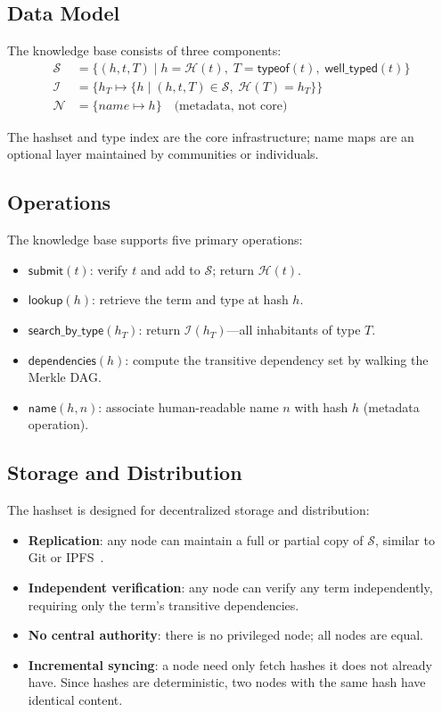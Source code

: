 \documentclass[11pt]{article}
\theoremstyle{definition}
\theoremstyle{plain}
\theoremstyle{remark}
\newcommand{\hash}{\mathcal{H}}
\newcommand{\hashset}{\mathcal{S}}
\newcommand{\typeindex}{\mathcal{I}}
\newcommand{\namemap}{\mathcal{N}}
\begin{document}
\subsection{Data Model}
\label{sec:data-model}

The knowledge base consists of three components:
\begin{align*}
  \hashset &= \{ (h, t, T) \mid h = \hash(t),\; T = \textsf{typeof}(t),\; \textsf{well\_typed}(t) \} \\
  \typeindex &= \{ h_T \mapsto \{ h \mid (h, t, T) \in \hashset,\; \hash(T) = h_T \} \} \\
  \namemap &= \{ \textit{name} \mapsto h \} \quad \text{(metadata, not core)}
\end{align*}

The hashset and type index are the core infrastructure; name maps are an optional layer
maintained by communities or individuals.

\subsection{Operations}
\label{sec:operations}

The knowledge base supports five primary operations:
\begin{itemize}[nosep]
  \item $\textsf{submit}(t)$: verify $t$ and add to $\hashset$; return $\hash(t)$.
  \item $\textsf{lookup}(h)$: retrieve the term and type at hash $h$.
  \item $\textsf{search\_by\_type}(h_T)$: return $\typeindex(h_T)$---all inhabitants of type $T$.
  \item $\textsf{dependencies}(h)$: compute the transitive dependency set by walking the Merkle DAG.
  \item $\textsf{name}(h, n)$: associate human-readable name $n$ with hash $h$ (metadata operation).
\end{itemize}

\subsection{Storage and Distribution}
\label{sec:distribution}

The hashset is designed for decentralized storage and distribution:
\begin{itemize}[nosep]
  \item \textbf{Replication}: any node can maintain a full or partial copy of $\hashset$,
    similar to Git or IPFS~\cite{ipfs}.
  \item \textbf{Independent verification}: any node can verify any term independently,
    requiring only the term's transitive dependencies.
  \item \textbf{No central authority}: there is no privileged node; all nodes are equal.
  \item \textbf{Incremental syncing}: a node need only fetch hashes it does not already have.
    Since hashes are deterministic, two nodes with the same hash have identical content.
\end{itemize}
\end{document}
